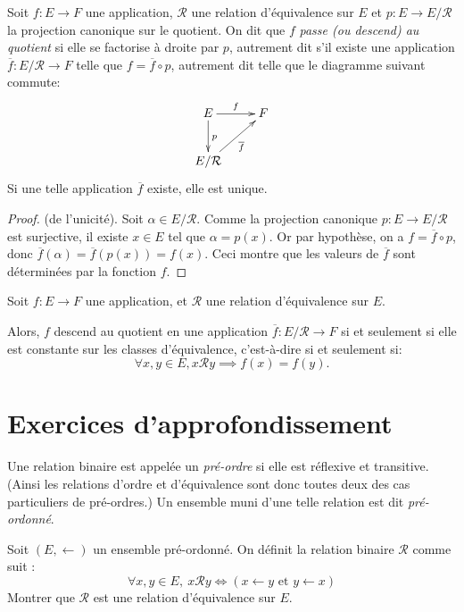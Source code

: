 \begin{propdef}
Soit $f : E\to F$ une application, $\mathcal R$ une relation d'équivalence sur $E$  et $p : E\to E/\mathcal R$ la projection canonique sur le quotient.
On dit que $f$ \emph{passe (ou descend) au quotient} si elle se factorise à droite par $p$, autrement dit s'il existe une application $\overline f : E/\mathcal R\to F$ telle que $f = \overline{f} \circ p$, autrement dit telle que le diagramme suivant commute:
\[
\xymatrix{
E \ar[r]^f \ar[d]^p & F\\
E/\mathcal R \ar[ur]_{\overline f}& 
}
\] 
Si une telle application $\overline{f}$ existe, elle est unique.
\end{propdef}
\begin{proof}(de l'unicité). Soit $\alpha \in E/\mathcal R$. Comme la projection canonique $p : E\to E/\mathcal R$ est surjective, il existe $x\in E$ tel que $\alpha=p(x)$. Or par hypothèse, on a $f = \overline{f} \circ p$, donc $\overline f(\alpha) =\overline f(p(x))= f(x)$. Ceci montre que les valeurs de $\overline f$ sont déterminées par la fonction $f$.
\end{proof}


\begin{proposition}
Soit $f : E\to F$ une application, et $\mathcal R$ une relation d'équivalence sur $E$.

Alors, $f$ descend au quotient en une application $\overline f : E/\mathcal R \to F$ si et seulement si elle est constante sur les classes d'équivalence, c'est-à-dire si et seulement si:
\[
\forall x,y\in E, x\mathcal R y \implies f(x)=f(y).
\]
\end{proposition}



\section{Exercices d'approfondissement}


\begin{exercice}
Une relation binaire est appelée un \emph{pré-ordre} si elle est réflexive et transitive. (Ainsi les relations d'ordre et d'équivalence sont donc toutes deux des cas particuliers de pré-ordres.) Un ensemble muni d'une telle relation est dit \emph{pré-ordonné}.

Soit $(E,\leftarrow)$ un ensemble pré-ordonné. On définit la relation binaire $\mathcal R$ comme suit : 
\[ \forall x, y \in E, \: x\mathcal R y \iff (x\leftarrow y \text{ et } y\leftarrow x)\]
Montrer que $\mathcal R$ est une relation d'équivalence sur $E$.
\end{exercice}

